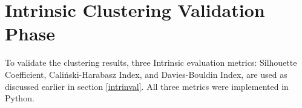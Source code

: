 





\section{Intrinsic Clustering Validation Phase}
To validate the clustering results, three Intrinsic evaluation metrics: Silhouette Coefficient, Caliński-Harabasz Index, and Davies-Bouldin Index, are used as discussed earlier in section \ref{intrinval}. All three metrics were implemented in Python.  



